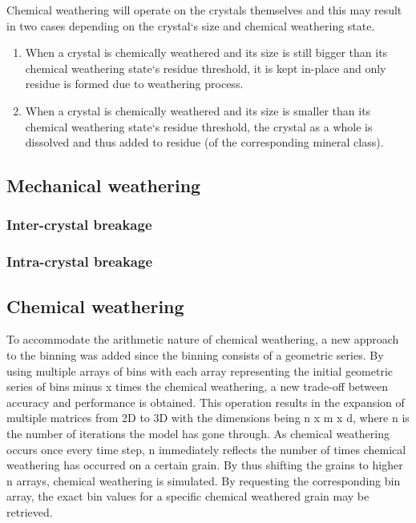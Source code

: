     Chemical weathering will operate on the crystals themselves and this may result in two cases depending on the crystal`s size and chemical weathering state.
    \begin{enumerate}
        \item When a crystal is chemically weathered and its size is still bigger than its chemical weathering state`s residue threshold, it is kept in-place and only residue is formed due to weathering process.
        \item When a crystal is chemically weathered and its size is smaller than its chemical weathering state`s residue threshold, the crystal as a whole is dissolved and thus added to residue (of the corresponding mineral class). %
    \end{enumerate}
    \subsection{Mechanical weathering}
        \subsubsection{Inter-crystal breakage}

        \subsubsection{Intra-crystal breakage}

    \subsection{Chemical weathering}
    To accommodate the arithmetic nature of chemical weathering, a new approach to the binning was added since the binning consists of a geometric series. %
    By using multiple arrays of bins with each array representing the initial geometric series of bins minus x times the chemical weathering, a new trade-off between accuracy and performance is obtained. %
    This operation results in the expansion of multiple matrices from 2D to 3D with the dimensions being n x m x d, where n is the number of iterations the model has gone through. %
    As chemical weathering occurs once every time step, n immediately reflects the number of times chemical weathering has occurred on a certain grain. %
    By thus shifting the grains to higher n arrays, chemical weathering is simulated. %
    By requesting the corresponding bin array, the exact bin values for a specific chemical weathered grain may be retrieved. %


